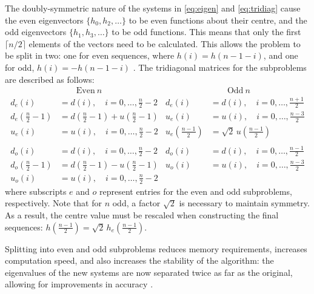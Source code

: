 The doubly-symmetric nature of the systems in \eqref{eq:eigen} and \eqref{eq:tridiag} cause the even eigenvectors $\{h_0,h_2,\ldots\}$ to be even functions about their centre, and the odd eigenvectors $\{h_1,h_3,\ldots\}$ to be odd functions.  This means that only the first $\lceil n/2 \rceil$ elements of the vectors need to be calculated.  This allows the problem to be split in two: one for even sequences, where $h(i)=h(n-1-i)$, and one for odd, $h(i)=-h(n-1-i)$ \cite{slepian:compute}.  The tridiagonal matrices for the subproblems are described as follows:
\begin{align*}
       & \qquad\text{Even}\ n &  &\qquad\text{Odd}\ n\\[0.3em]
    d_e(i) & = d(i),\quad i=0,\ldots,\tfrac{n}{2}-2 &               d_e(i) & = d(i),\quad i=0,\ldots,\tfrac{n+1}{2}\\
    d_e(\tfrac{n}{2}-1) & = d(\tfrac{n}{2}-1)+u(\tfrac{n}{2}-1) &   u_e(i) & = u(i), \quad i=0,\ldots,\tfrac{n-3}{2}\\
    u_e(i) & = u(i), \quad i=0,\ldots,\tfrac{n}{2}-2 &              u_e(\tfrac{n-1}{2}) & = \sqrt{2}\,u(\tfrac{n-1}{2})\\
    \\
    d_o(i) & = d(i),\quad i=0,\ldots,\tfrac{n}{2}-2 &               d_o(i) & = d(i),\quad i=0,\ldots,\tfrac{n-1}{2}\\
    d_o(\tfrac{n}{2}-1) & = d(\tfrac{n}{2}-1)-u(\tfrac{n}{2}-1) &   u_o(i) & = u(i),\quad i=0,\ldots,\tfrac{n-3}{2}\\
    u_o(i) & = u(i), \quad i=0,\ldots,\tfrac{n}{2}-2
\end{align*}
where subscripts $e$ and $o$ represent entries for the even and odd subproblems, respectively.  Note that for $n$ odd, a factor $\sqrt{2}$ is necessary to maintain symmetry.  As a result, the centre value must be rescaled when constructing the final sequences: $h(\tfrac{n-1}{2})=\sqrt{2}\,h_e(\tfrac{n-1}{2})$.

Splitting into even and odd subproblems reduces memory requirements, increases computation speed, and also increases the stability of the algorithm: the eigenvalues of the new systems are now separated twice as far as the original, allowing for improvements in accuracy \cite{thomson:lecture}.